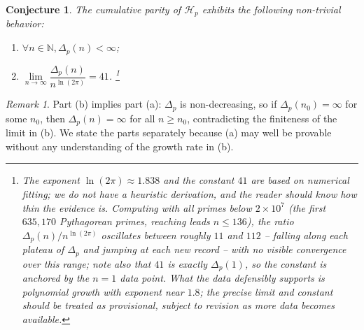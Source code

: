 \documentclass{article}
\theoremstyle{plain}
\newtheorem{conjecture}{Conjecture}
\theoremstyle{definition}
\theoremstyle{remark}
\newtheorem{remark}{Remark}
\begin{document}
\begin{conjecture}\label{conj:parity}
The cumulative parity of $\mathcal{H}_p$ exhibits the following non-trivial behavior:
\begin{enumerate}
  \item[(a)] $\forall n\in \mathbb{N}, \Delta_p(n) < \infty$;
  \item[(b)] $\lim\limits_{n \rightarrow \infty} \dfrac{\Delta_p(n)}{n^{\ln(2 \pi)}} = 41$.%
\footnote{The exponent $\ln(2\pi) \approx 1.838$ and the constant $41$ are
based on numerical fitting; we do not have a heuristic derivation, and the
reader should know how thin the evidence is. Computing with all primes below
$2 \times 10^7$ (the first $635{,}170$ Pythagorean primes, reaching leads
$n \le 136$), the ratio $\Delta_p(n)/n^{\ln(2\pi)}$ oscillates between
roughly $11$ and $112$ -- falling along each plateau of $\Delta_p$ and
jumping at each new record -- with no visible convergence over this range;
note also that $41$ is exactly $\Delta_p(1)$, so the constant is anchored
by the $n = 1$ data point. What the data defensibly supports is polynomial
growth with exponent near $1.8$; the precise limit and constant should be
treated as provisional, subject to revision as more data becomes
available.}
\end{enumerate}
\end{conjecture}

\begin{remark}
Part (b) implies part (a): $\Delta_p$ is non-decreasing, so if
$\Delta_p(n_0) = \infty$ for some $n_0$, then $\Delta_p(n) = \infty$ for all
$n \ge n_0$, contradicting the finiteness of the limit in (b). We state the
parts separately because (a) may well be provable without any understanding
of the growth rate in (b).
\end{remark}
\end{document}
